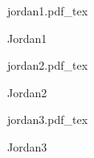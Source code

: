 \documentclass[a4paper]{article}
\newcommand{\incfig}[1]{%
    \def\svgwidth{\columnwidth}
    {#1.pdf_tex}
}
\begin{document}
\begin{figure}[ht]
    \centering
    \begin{minipage}[c][\totalheight][c]{\columnwidth}
    \incfig{jordan1}
    \caption{Jordan1}
    \end{minipage}
    \label{fig:jordan1}
\end{figure}

\begin{figure}[ht]
    \centering
    \begin{minipage}[c][\totalheight][c]{\columnwidth}
    \incfig{jordan2}
    \caption{Jordan2}
    \end{minipage}
    \label{fig:jordan2}
\end{figure}

\begin{figure}[ht]
    \centering
    \begin{minipage}[c][\totalheight][c]{\columnwidth}
    \incfig{jordan3}
    \caption{Jordan3}
    \end{minipage}
    \label{fig:jordan3}
\end{figure}
\end{document}
